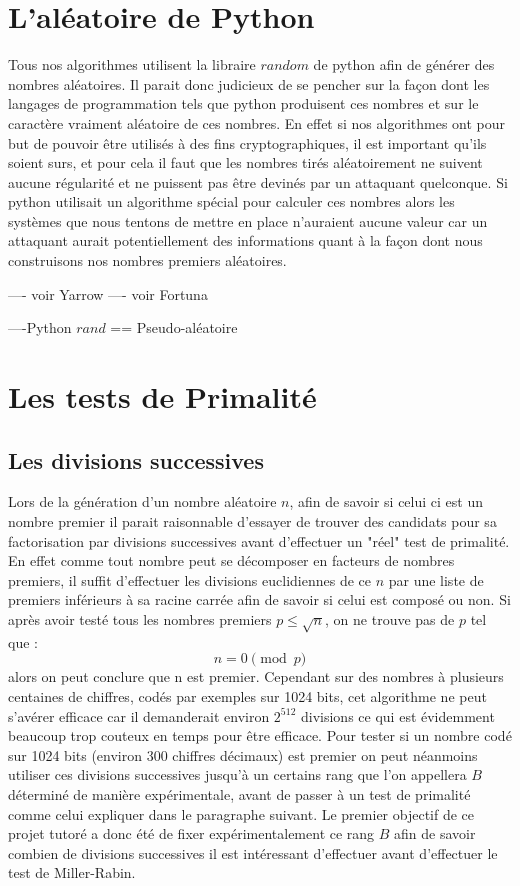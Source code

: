 \documentclass{article}
\begin{document}
\section*{L'aléatoire de Python}
Tous nos algorithmes utilisent la libraire $random$ de python afin de générer des nombres aléatoires. Il parait donc judicieux de se pencher sur la façon dont les langages de programmation tels que python produisent ces nombres et sur le caractère vraiment aléatoire de ces nombres.
En effet si nos algorithmes ont pour but de pouvoir être utilisés à des fins cryptographiques, il est important qu'ils soient surs, et pour cela il faut que les nombres tirés aléatoirement ne suivent aucune régularité et ne puissent pas être devinés par un attaquant quelconque.
Si python utilisait un algorithme spécial pour calculer ces nombres alors les systèmes que nous tentons de mettre en place n'auraient aucune valeur car un attaquant aurait potentiellement des informations quant à la façon dont nous construisons nos nombres premiers aléatoires. \newline

---- voir  Yarrow \newline
---- voir  Fortuna \newline

----Python $rand$ == Pseudo-aléatoire

\section{Les tests de Primalité}

\subsection{Les divisions successives}
Lors de la génération d'un nombre aléatoire $n$, afin de savoir si celui ci est un nombre premier il parait raisonnable d'essayer de trouver des candidats pour sa factorisation par divisions successives avant d'effectuer un "réel" test de primalité. En effet comme tout nombre peut se décomposer en facteurs de nombres premiers, il suffit d'effectuer les divisions euclidiennes de ce $n$ par une liste de premiers inférieurs à sa racine carrée afin de savoir si celui est composé ou non. Si après avoir testé tous les nombres premiers  $ p \leq \sqrt{n}$, on ne trouve pas de $p$ tel que : $$n=0\pmod{p}$$ alors on peut conclure que n est premier. Cependant sur des nombres à plusieurs centaines de chiffres, codés par exemples sur 1024 bits, cet algorithme ne peut s'avérer efficace car il demanderait environ $ 2^{512} $ divisions ce qui est évidemment beaucoup trop couteux en temps pour être efficace. 
Pour tester si un nombre codé sur 1024 bits (environ 300 chiffres décimaux) est premier on peut néanmoins utiliser ces divisions successives jusqu'à un certains rang que l'on appellera $B$ déterminé de manière expérimentale, avant de passer à un test de primalité comme celui expliquer dans le paragraphe suivant. 
Le premier objectif de ce projet tutoré a donc été de fixer expérimentalement ce rang $B$ afin de savoir combien de divisions successives il est intéressant d'effectuer avant d'effectuer le test de Miller-Rabin.
\end{document}
